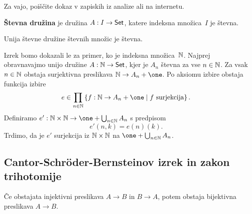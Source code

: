 \begin{dokaz}
  Za vajo, poiščite dokaz v zapiskih iz analize ali na internetu.
\end{dokaz}

\begin{definicija}
  \textbf{Števna družina} je družina $A : I \to \mathsf{Set}$, katere indeksna množica~$I$ je števna.
\end{definicija}

\begin{izrek}
  Unija števne družine števnih množic je števna.
\end{izrek}

\begin{dokaz}
  Izrek bomo dokazali le za primer, ko je indeksna množica~$\mathbb{N}$.
  Najprej obravnavajmo unijo družine $A : \mathbb{N} \to \mathsf{Set}$, kjer je $A_n$ števna za vse $n \in \mathbb{N}$.
  Za vsak $n \in \mathbb{N}$ obstaja surjektivna preslikava $\NN \to A_n + \one$. Po aksiomu izbire obstaja funkcija izbire
  \begin{equation*}
    e \in \prod_{n \in \NN} \set{f : \NN \to A_n + \one \such \text{$f$ surjekcija}}.
  \end{equation*}
  Definiramo $e' : \NN \times \NN \to \one + \bigcup_{n \in \NN} A_n$ s predpisom
  \begin{equation*}
    e'(n, k) = e(n)(k).
  \end{equation*}
  Trdimo, da je $e'$ surjekcija iz $\mathbb{N} \times \mathbb{N}$ na $\one + \bigcup_{n \in \NN} A_n$.
\end{dokaz}


\subsection{Cantor-Schröder-Bernsteinov izrek in zakon trihotomije}

\begin{izrek}
  Če obstajata injektivni preslikava $A \to B$ in $B \to A$, potem obstaja bijektivna preslikava $A \to B$.
\end{izrek}


